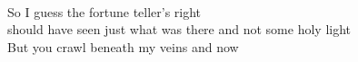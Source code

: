 \\
So I guess the fortune teller's right \\
should have seen just what was there and not some holy light \\
But you crawl beneath my veins and now \\
